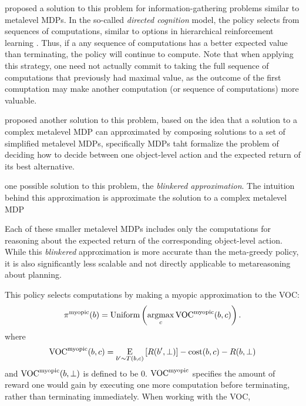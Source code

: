 \citet{gabaix2005bounded} proposed a solution to this problem for information-gathering problems similar to metalevel MDPs. In the so-called \emph{directed cognition} model, the policy selects from sequences of computations, similar to options in hierarchical reinforcement learning \citep{sutton1999mdps}. Thus, if a any sequence of computations has a better expected value than terminating, the policy will continue to compute. Note that when applying this strategy, one need not actually commit to taking the full sequence of computations that previously had maximal value, as the outcome of the first comuptation may make another computation (or sequence of computations) more valuable.

\citet{hay2012selecting} proposed another solution to this problem, based on the idea that a solution to a complex metalevel MDP can approximated by composing solutions to a set of simplified metalevel MDPs, specifically MDPs taht formalize the problem of deciding how to decide between one object-level action and the expected return of its best alternative.

one possible solution to this problem, the \emph{blinkered approximation}. The intuition behind this approximation is approximate the solution to a complex metalevel MDP 


Each of these smaller metalevel MDPs includes only the computations for reasoning about the expected return of the corresponding object-level action.
While this \textit{blinkered} approximation is more accurate than the meta-greedy policy, it is also significantly less scalable and not directly applicable to metareasoning about planning.



This policy selects computations by making a myopic approximation to the VOC:
\begin{equation}
\pi^{\mathrm{myopic}}(b) = \text{Uniform}\left(\operatorname*{argmax}_c \text{VOC}^{\mathrm{myopic}}(b, c)\right).
\end{equation}
where
\begin{equation*}
  \text{VOC}^{\mathrm{myopic}}(b,c) = \operatorname*{E}_{b' \sim T(b, c)}\left[
    R(b',\bot)
  \right] - \text{cost}(b,c) - R(b, \bot)
\end{equation*}
and $\text{VOC}^{\mathrm{myopic}}(b,\bot)$ is defined to be 0. $\text{VOC}^{\mathrm{myopic}}$ specifies the amount of reward one would gain by executing one more computation before terminating, rather than terminating immediately. When working with the VOC, 



